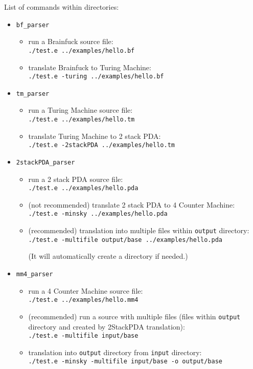 \documentclass[english,shortabstract,mgr]{iithesis}
\begin{document}
List of commands within directories:
\begin{itemize}
  \item \texttt{bf\_parser}
    \begin{itemize}
      \item run a Brainfuck source file: \\ \texttt{./test.e ../examples/hello.bf}
      \item translate Brainfuck to Turing Machine: \\ \texttt{./test.e -turing ../examples/hello.bf}
    \end{itemize}
  \item \texttt{tm\_parser}
    \begin{itemize}
      \item run a Turing Machine source file: \\ \texttt{./test.e ../examples/hello.tm}
      \item translate Turing Machine to 2 stack PDA: \\ \texttt{./test.e -2stackPDA ../examples/hello.tm}
    \end{itemize}
  \item \texttt{2stackPDA\_parser}
    \begin{itemize}
      \item run a 2 stack PDA source file: \\ \texttt{./test.e ../examples/hello.pda}
      \item (not recommended) translate 2 stack PDA to 4 Counter Machine: \\ \texttt{./test.e -minsky ../examples/hello.pda}
      \item (recommended) translation into multiple files within \texttt{output}
        directory: \\ \texttt{./test.e -multifile output/base ../examples/hello.pda}

        (It will automatically create a directory if needed.)
    \end{itemize}
  \item \texttt{mm4\_parser}
    \begin{itemize}
      \item run a 4 Counter Machine source file: \\ \texttt{./test.e ../examples/hello.mm4}
      \item (recommended) run a source with multiple files (files within \texttt{output}
        directory and created by 2StackPDA translation): \\ \texttt{./test.e -multifile input/base}
      \item translation into \texttt{output} directory from \texttt{input}
        directory: \\ \texttt{./test.e -minsky -multifile input/base -o output/base}


\end{itemize}
\end{itemize}
\end{document}
